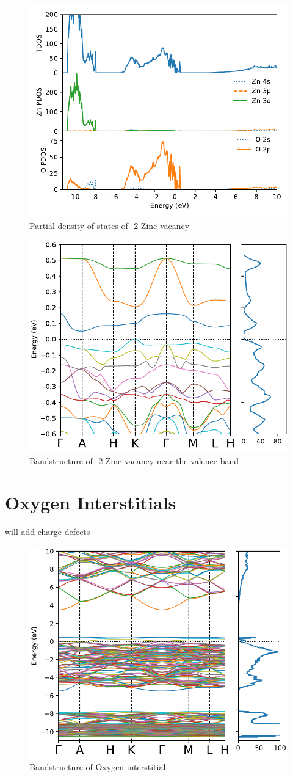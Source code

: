 \begin{figure}[tbh!]
	\centering
	\includegraphics[width=0.6\linewidth]{"images/rnd/dos-pdos_Zn_vac-n2"}
	\caption[Partial density of states of -2 Zinc vacancy]{Partial density of states of -2 Zinc vacancy}
\end{figure}

\begin{figure}[tbh!]
	\centering
	\includegraphics[width=0.6\linewidth]{"images/rnd/band-dos-close_Zn_vac-n2"}
	\caption[Bandstructure of -2 Zinc vacancy near the valence band]{Bandstructure of -2 Zinc vacancy near the valence band}
\end{figure}

\clearpage

\section{Oxygen Interstitials}
will add charge defects

\begin{figure}[tbh!]
	\centering
	\includegraphics[width=0.6\linewidth]{"images/rnd/band-dos_O_i"}
	\caption[Bandstructure of Oxygen interstitial]{Bandstructure of Oxygen interstitial}
\end{figure}

